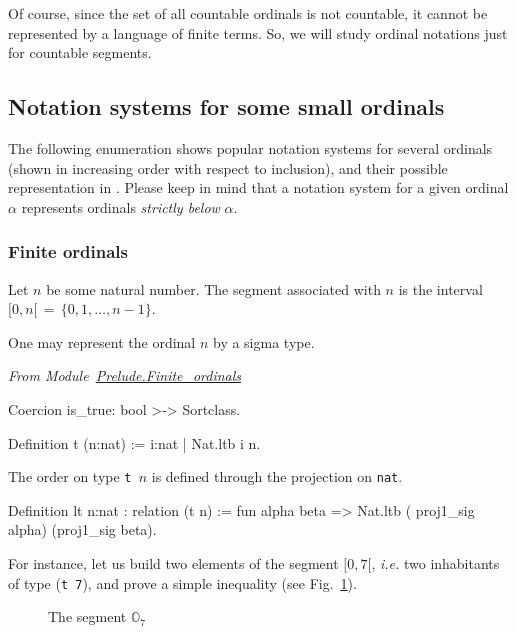 Of course, since the set of all countable ordinals is not countable, it cannot be represented by a language of finite terms. So, we will study ordinal notations just  for countable segments.



\subsection{Notation systems for some small ordinals}

The following enumeration  shows  popular notation systems for several ordinals (shown in increasing order with respect to inclusion), and their possible representation in \coq{}.
Please keep in mind that a notation system for a given ordinal $\alpha$ represents 
ordinals \emph{strictly below} $\alpha$.

\subsubsection{Finite ordinals}
Let $n$ be some natural number. The segment associated with $n$ is the interval 
$[0,n[\,=\,\{0,1,\dots,n-1\}$. 

One may represent the ordinal $n$ by a sigma type.


\vspace{4pt}
\noindent\emph{From Module~\href{../src/html/hydras.Prelude.Finite_ordinals.html}{Prelude.Finite\_ordinals}}


\begin{Coqsrc}
Coercion is_true: bool >-> Sortclass.

Definition t (n:nat) := {i:nat | Nat.ltb i  n}.
\end{Coqsrc}

The order on type \texttt{t $n$} is defined through the projection on \texttt{nat}.


\begin{Coqsrc}
Definition lt {n:nat} : relation (t n) :=
  fun alpha beta => Nat.ltb ( proj1_sig alpha) (proj1_sig beta).
\end{Coqsrc}

For instance, let us build two elements of the segment $[0, 7[$, \emph{i.e.} two
inhabitants of   type (\texttt{t 7}), and prove a simple  inequality (see Fig.~\ref{fig:O7}).

\begin{figure}[h]
\centering
{}

\caption{The segment $\mathbb{O}_7$\label{fig:O7}}
\end{figure}
  
